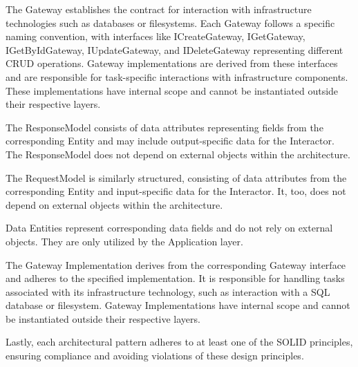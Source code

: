 The Gateway establishes the contract for interaction with infrastructure technologies such
as databases or filesystems. Each Gateway follows a specific naming convention, with
interfaces like ICreateGateway, IGetGateway, IGetByIdGateway, IUpdateGateway, and
IDeleteGateway representing different CRUD operations. Gateway implementations are derived
from these interfaces and are responsible for task-specific interactions with
infrastructure components. These implementations have internal scope and cannot be
instantiated outside their respective layers.

The ResponseModel consists of data attributes representing fields from the corresponding
Entity and may include output-specific data for the Interactor. The ResponseModel does not
depend on external objects within the architecture.

The RequestModel is similarly structured, consisting of data attributes from the
corresponding Entity and input-specific data for the Interactor. It, too, does not depend
on external objects within the architecture.

Data Entities represent corresponding data fields and do not rely on external objects.
They are only utilized by the Application layer.

The Gateway Implementation derives from the corresponding Gateway interface and adheres to
the specified implementation. It is responsible for handling tasks associated with its
infrastructure technology, such as interaction with a SQL database or filesystem. Gateway
Implementations have internal scope and cannot be instantiated outside their respective
layers.

Lastly, each architectural pattern adheres to at least one of the SOLID principles,
ensuring compliance and avoiding violations of these design principles.
